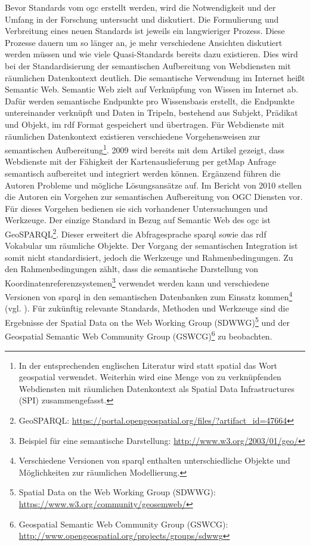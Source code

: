 Bevor Standards vom \Gls{ogc} erstellt werden, wird die Notwendigkeit und der Umfang in der Forschung untersucht und diskutiert.
Die Formulierung und Verbreitung eines neuen Standards ist jeweils ein langwieriger Prozess.
Diese Prozesse dauern um so länger an, je mehr verschiedene Ansichten diskutiert werden müssen und wie viele Quasi-Standards bereits dazu existieren.
Dies wird bei der Standardisierung der semantischen Aufbereitung von Webdiensten mit räumlichen Datenkontext deutlich.
Die semantische Verwendung im Internet heißt Semantic Web.
Semantic Web zielt auf Verknüpfung von Wissen im Internet ab.
Dafür werden semantische Endpunkte pro Wissensbasis erstellt, die Endpunkte untereinander verknüpft und Daten in Tripeln, bestehend aus Subjekt, Prädikat und Objekt, im \Gls{rdf} Format gespeichert und übertragen.
Für Webdienste mit räumlichen Datenkontext existieren verschiedene Vorgehensweisen zur semantischen Aufbereitung\footnote{In der entsprechenden englischen Literatur wird statt spatial das Wort geospatial verwendet. Weiterhin wird eine Menge von zu verknüpfenden Webdiensten mit räumlichen Datenkontext als Spatial Data Infrastructures (SPI) zusammengefasst.}.
2009 wird bereits mit dem Artikel \cite{report:semgeospatinte} gezeigt, dass Webdienste mit der Fähigkeit der Kartenauslieferung per \glqq{}getMap\grqq{} Anfrage semantisch aufbereitet und integriert werden können.
Ergänzend führen die Autoren Probleme und mögliche Lösungsansätze auf.
Im Bericht \cite{report:semenspa} von 2010 stellen die Autoren ein Vorgehen zur semantischen Aufbereitung von OGC Diensten vor.
Für dieses Vorgehen bedienen sie sich vorhandener Untersuchungen und Werkzeuge.
Der einzige Standard in Bezug auf Semantic Web des \Gls{ogc} ist GeoSPARQL\footnote{GeoSPARQL: \url{https://portal.opengeospatial.org/files/?artifact_id=47664}}.
Dieser erweitert die Abfragesprache \Gls{sparql} sowie das \Gls{rdf} Vokabular um räumliche Objekte.
Der Vorgang der semantischen Integration ist somit nicht standardisiert, jedoch die Werkzeuge und Rahmenbedingungen.
Zu den Rahmenbedingungen zählt, dass die semantische Darstellung von Koordinatenreferenzsystemen\footnote{Beispiel für eine semantische Darstellung: \url{http://www.w3.org/2003/01/geo/}} verwendet werden kann und verschiedene Versionen von \Gls{sparql} in den semantischen Datenbanken zum Einsatz kommen\footnote{Verschiedene Versionen von \Gls{sparql} enthalten unterschiedliche Objekte und Möglichkeiten zur räumlichen Modellierung.} (vgl. \cite[S.5]{book:semgeosparql}).
Für zukünftig relevante Standards, Methoden und Werkzeuge sind die Ergebnisse der Spatial Data on the Web Working Group (SDWWG)\footnote{Spatial Data on the Web Working Group (SDWWG): \url{https://www.w3.org/community/geosemweb/}} und der Geospatial Semantic Web Community Group (GSWCG)\footnote{Geospatial Semantic Web Community Group (GSWCG): \url{http://www.opengeospatial.org/projects/groups/sdwwg}} zu beobachten. 

